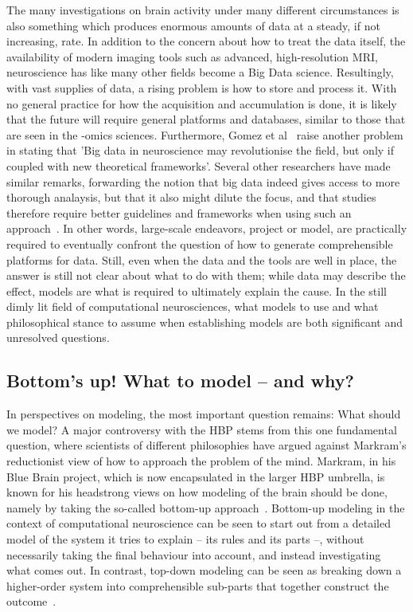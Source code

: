 \documentclass[10pt]{article}\usepackage[]{graphicx}\usepackage[]{color}
\theoremstyle{plain}
\begin{document}
\begin{multicols*}{2}
	The many investigations on brain activity under many different circumstances is also something which produces enormous amounts of data at a steady, if not increasing, rate. In addition to the concern about how to treat the data itself, the availability of modern imaging tools such as advanced, high-resolution MRI, neuroscience has like many other fields become a Big Data science. Resultingly, with vast supplies of data, a rising problem is how to store and process it. With no general practice for how the acquisition and accumulation is done, it is likely that the future will require general platforms and databases, similar to those that are seen in the -omics sciences. Furthermore, Gomez et al~\cite{gomez2014big} raise another problem in stating that 'Big data in neuroscience may revolutionise the field, but only if coupled with new theoretical frameworks'. Several other researchers have made similar remarks, forwarding the notion that big data indeed gives access to more thorough analaysis, but that it also might dilute the focus, and that studies therefore require better guidelines and frameworks when using such an approach~\cite{sejnowski2014putting,howe2008big,lynch2008big,ferguson2014big}. In other words, large-scale endeavors, project or model, are practically required to eventually confront the question of how to generate comprehensible platforms for data.
Still, even when the data and the tools are well in place, the answer is still not clear about what to do with them; while data may describe the effect, models are what is required to ultimately explain the cause. In the still dimly lit field of computational neurosciences, what models to use and what philosophical stance to assume when establishing models are both significant and unresolved questions.   
					          
	\subsection*{Bottom's up! What to model -- and why?}
	In perspectives on modeling, the most important question remains: What should we model? A major controversy with the HBP stems from this one fundamental question, where scientists of different philosophies have argued against Markram's reductionist view of how to approach the problem of the mind. Markram, in his Blue Brain project, which is now encapsulated in the larger HBP umbrella, is known for his headstrong views on how modeling of the brain should be done, namely by taking the so-called bottom-up approach~\cite{sarter2001cognitive}. Bottom-up modeling in the context of computational neuroscience can be seen to start out from a detailed model of the system it tries to explain -- its rules and its parts --, without necessarily taking the final behaviour into account, and instead investigating what comes out. In contrast, top-down modeling can be seen as breaking down a higher-order system into comprehensible sub-parts that together construct the outcome~\cite{sarter2001cognitive}.


\end{multicols*}
\end{document}
